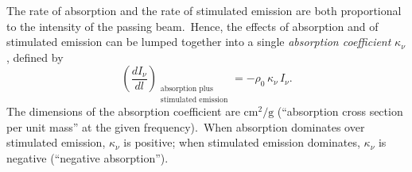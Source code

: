 The rate of absorption and the rate of stimulated emission are both proportional
to the intensity of the passing beam.\ Hence, the effects of absorption and of
stimulated emission can be lumped together into a single \textit{absorption coefficient}
$\kappa_\nu$, defined by
%
\begin{equation}
\left(\frac{dI_\nu}{dl}\right)_{\!\substack{\text{absorption plus}\\[2pt]
  \text{stimulated emission}}}
  = -\rho_0\,\kappa_\nu\,I_\nu.
\tag{2.6.18}
\end{equation}
%
The dimensions of the absorption coefficient are $\mathrm{cm}^2/\mathrm{g}$ (``absorption cross section
per unit mass'' at the given frequency).\ When absorption dominates over
stimulated emission, $\kappa_\nu$ is positive; when stimulated emission dominates,
$\kappa_\nu$ is negative (``negative absorption'').

